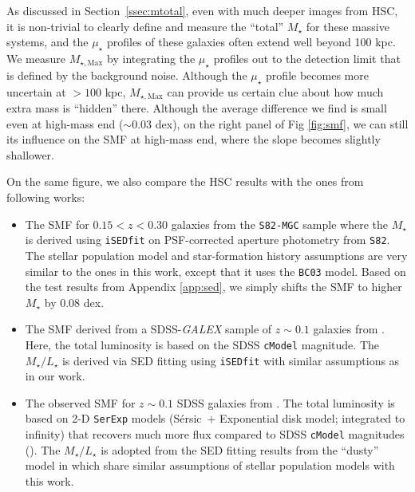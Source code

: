\documentclass[a4paper,fleqn,usenatbib]{mnras}
\def\ser{{S\'{e}rsic\ }}
\def\cmodel{\texttt{cModel}}
\def\mstar{{$M_{\star}$}}
\def\mtot{{$M_{\star,100\mathrm{kpc}}$}}
\def\mmax{{$M_{\star,\mathrm{Max}}$}}
\def\m2l{{$M_{\star}/L_{\star}$}}
\def\mden{{$\mu_{\star}$}}
\begin{document}
    As discussed in Section~\ref{ssec:mtotal}, even with much deeper images from HSC,
    it is non-trivial to clearly define and measure the ``total'' \mstar{} for 
    these massive systems, and the \mden{} profiles of these galaxies often extend 
    well beyond 100 kpc. 
    We measure \mmax{} by integrating the \mden{} profiles out to the detection 
    limit that is defined by the background noise.
    Although the \mden{} profile becomes more uncertain at $>100$ kpc, \mmax{} can
    provide us certain clue about how much extra mass is ``hidden'' there. 
    Although the average difference we find is small even at high-mass end 
    (${\sim}0.03$ dex), on the right panel of Fig \ref{fig:smf}, we can still its 
    influence on the SMF at high-mass end, where the slope becomes slightly 
    shallower. 
    
    
    On the same figure, we also compare the HSC results with the ones from following 
    works:

    \begin{itemize}

        \item The SMF for $0.15 < z < 0.30$ galaxies from the \texttt{S82-MGC} sample
            \citep{Leauthaud2016} where the \mstar{} is derived using 
            \texttt{iSEDfit} on PSF-corrected aperture photometry from 
            \texttt{S82}.
            The stellar population model and star-formation history assumptions are 
            very similar to the ones in this work, except that it uses the 
            \texttt{BC03} model. 
            Based on the test results from Appendix \ref{app:sed}, we simply shifts 
            the SMF to higher \mstar{} by 0.08 dex. 
    
        \item The SMF derived from a SDSS-\textit{GALEX} sample of $z{\sim} 0.1$ 
            galaxies from \citet{Moustakas13}. 
            Here, the total luminosity is based on the SDSS \cmodel{} magnitude. 
            The \m2l{} is derived via SED fitting using \texttt{iSEDfit} with similar 
            assumptions as in our work.
            
        \item The observed SMF for $z{\sim} 0.1$ SDSS galaxies from 
            \citet{Bernardi2017}. 
            The total luminosity is based on 2-D \texttt{SerExp} models 
            (\ser{}$+$ Exponential disk model; integrated to infinity) that 
            recovers much more flux compared to SDSS \cmodel{} magnitudes 
            (\citealt{Bernardi2013, Meert2015}). 
            The \m2l{} is adopted from the SED fitting results from the ``dusty'' 
            model in \citet{Mendel2014} which share similar assumptions of stellar 
            population models with this work.
           
    \end{itemize}
    
\end{document}

